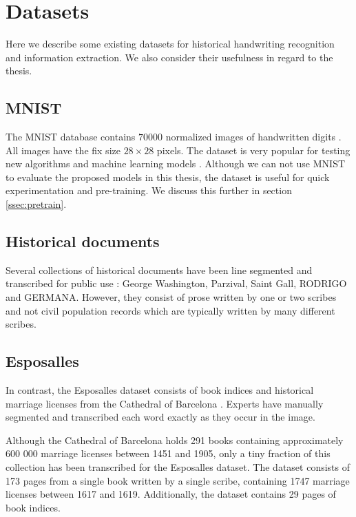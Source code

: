 \section{Datasets}

Here we describe some existing datasets for historical handwriting recognition and information extraction. We also consider their usefulness in regard to the thesis.

\subsection{MNIST}

The MNIST database contains $70000$ normalized images of handwritten digits \cite{MNIST_orig}. All images have the fix size $28 \times 28$ pixels. The dataset is very popular for testing new algorithms and machine learning models \cite{MNIST}.
Although we can not use MNIST to evaluate the proposed models in this thesis, the dataset is useful for quick experimentation and pre-training. We discuss this further in section \ref{ssec:pretrain}.

\subsection{Historical documents}
Several collections of historical documents have been line segmented and transcribed for public use \cite{esposalles}: George Washington, Parzival, Saint Gall, RODRIGO and GERMANA. However, they consist of prose written by one or two scribes and not civil population records which are typically written by many different scribes.

\subsection{Esposalles}
In contrast, the Esposalles dataset consists of book indices and historical marriage licenses from the Cathedral of Barcelona \cite{esposalles}. Experts have manually segmented and transcribed each word exactly as they occur in the image.

Although the Cathedral of Barcelona holds 291 books containing approximately 600 000 marriage licenses between 1451 and 1905, only a tiny fraction of this collection has been transcribed for the Esposalles dataset. The dataset consists of 173 pages from a single book written by a single scribe, containing 1747 marriage licenses between 1617 and 1619. Additionally, the dataset contains 29 pages of book indices.

